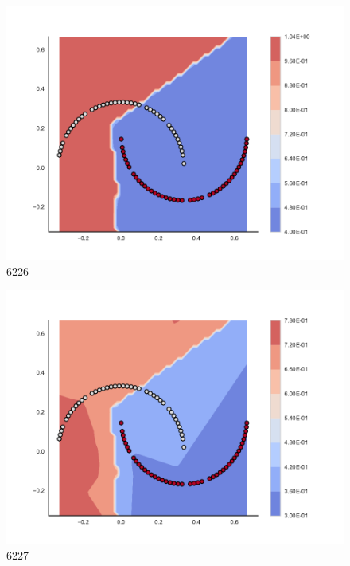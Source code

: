 \begin{subfigure}[b]{0.09\textwidth}
    \includegraphics[clip, trim=2.35cm 1.75cm 4.5cm 0cm,width=\textwidth]{img/convergence/6226.pdf}
    \caption{6226}
    \label{fig:convergence_6226}
\end{subfigure}
%
\begin{subfigure}[b]{0.09\textwidth}
    \includegraphics[clip, trim=2.35cm 1.75cm 4.5cm 0cm,width=\textwidth]{img/convergence/6227.pdf}
    \caption{6227}
    \label{fig:convergence_6227}
\end{subfigure}
%
